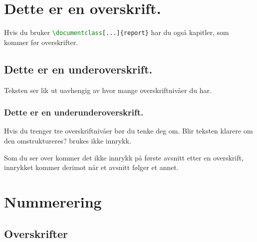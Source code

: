 \maketitle  %

\begin{abstract} %
	Dette dokumentet er laget for å gi en innføring i \LaTeX, med nok informasjon til å skrive
	det som forventes av oppgavebesvarelser og rapporter i løpet av bachelorstudiet.
	Jeg forsøker å gi en forståelse av prinsippene i \LaTeX som vil gjøre det lettere å lete
	seg fram til mer informasjon der det trengs.
	Forslag til forbedringer mottas med takk på \href{github}. Der ligger også den nyeste
	versjonen av dette dokumentet.
\end{abstract}

\section{Dette er en overskrift.}
Hvis du bruker \lstinline[language=tex, basicstyle=\ttfamily]$\documentclass[...]{report}$
har du også kapitler, som kommer før overskrifter.

\subsection{Dette er en underoverskrift.}
Teksten ser lik ut uavhengig av hvor mange overskriftnivåer du har.

\subsubsection{Dette er en underunderoverskrift.}
Hvis du trenger tre overskriftnivåer bør du tenke deg om. Blir teksten klarere
om den omstruktureres?
brukes ikke innrykk.

Som du ser over kommer det ikke innrykk på første avsnitt etter en overskrift, innrykket
kommer derimot når et avsnitt følger et annet.

\section{Nummerering}

\lstset{language=tex, basicstyle=\ttfamily} %

\subsection{Overskrifter}

